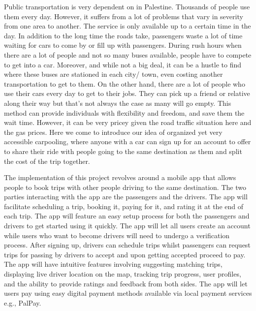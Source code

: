 \documentclass[a4paper, 12pt]{report} %
\begin{document}
            Public transportation is very dependent on in Palestine. Thousands of people use them every day. However, it suffers from a lot of problems that vary in severity from one area to another. The service is only available up to a certain time in the day. In addition to the long time the roads take, passengers waste a lot of time waiting for cars to come by or fill up with passengers. During rush hours when there are a lot of people and not so many buses available, people have to compete to get into a car. Moreover, and while not a big deal, it can be a hustle to find where these buses are stationed in each city/ town, even costing another transportation to get to them. On the other hand, there are a lot of people who use their cars every day to get to their jobs. They can pick up a friend or relative along their way but that's not always the case as many will go empty. This method can provide individuals with flexibility and freedom, and save them the wait time. However, it can be very pricey given the road traffic situation here and the gas prices. Here we come to introduce our idea of organized yet very accessible carpooling, where anyone with a car can sign up for an account to offer to share their ride with people going to the same destination as them and split the cost of the trip together. 

            The implementation of this project revolves around a mobile app that allows people to book trips with other people driving to the same destination. The two parties interacting with the app are the passengers and the drivers. The app will facilitate scheduling a trip, booking it, paying for it, and rating it at the end of each trip. The app will feature an easy setup process for both the passengers and drivers to get started using it quickly. The app will let all users create an account while users who want to become drivers will need to undergo a verification process. After signing up, drivers can schedule trips whilst passengers can request trips for passing by drivers to accept and upon getting accepted proceed to pay. The app will have intuitive features involving suggesting matching trips, displaying live driver location on the map, tracking trip progress, user profiles, and the ability to provide ratings and feedback from both sides. The app will let users pay using easy digital payment methods available via local payment services e.g., PalPay. 
        
\end{document}
